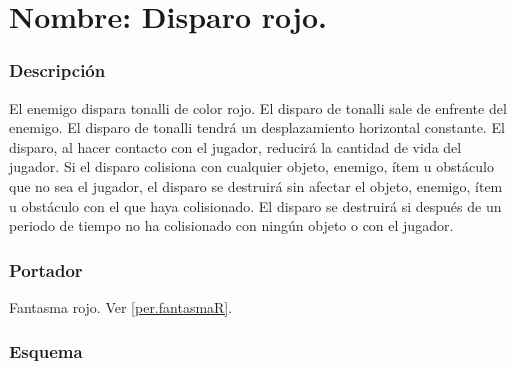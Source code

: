 		\section{Nombre: Disparo rojo.} \label{hab.disparoR}
		\subsubsection{Descripción}
El enemigo dispara tonalli de color rojo. El disparo de tonalli sale de enfrente del enemigo. El disparo de tonalli tendrá un desplazamiento horizontal constante. El disparo, al hacer contacto con el jugador, reducirá la cantidad de vida del jugador. Si el disparo colisiona con cualquier objeto, enemigo, ítem u obstáculo que no sea el jugador, el disparo se destruirá sin afectar el objeto, enemigo, ítem u obstáculo con el que haya colisionado. El disparo se destruirá si después de un periodo de tiempo no ha colisionado con ningún objeto o con el jugador.
		\subsubsection{Portador}
		Fantasma rojo. Ver \ref{per.fantasmaR}.
		\subsubsection{Esquema}
	